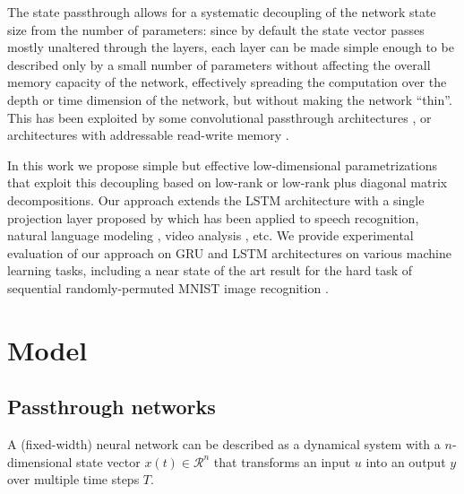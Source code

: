 \documentclass[11pt,a4paper]{article}
\begin{document}
The state passthrough allows for a systematic decoupling of the network state size from the number of parameters: since by default the state vector passes mostly unaltered through the layers, each layer can be made simple enough to be described only by a small number of parameters without affecting the overall memory capacity of the network, effectively spreading the computation over the depth or time dimension of the network, but without making the network ``thin''. This has been exploited by some convolutional passthrough architectures \cite{Srivastava2015, He2015, Kaiser2015}, or architectures with addressable read-write memory \cite{Graves2014, Danihelka2016}.

In this work we propose simple but effective low-dimensional parametrizations that exploit this decoupling based on low-rank or low-rank plus diagonal matrix decompositions. Our approach extends the LSTM architecture with a single projection layer proposed by  which has been applied to speech recognition, natural language modeling \cite{Jozefowicz2016}, video analysis \cite{Sun2015}, etc. We provide experimental evaluation of our approach on GRU and LSTM architectures on various machine learning tasks, including a near state of the art result for the hard task of sequential randomly-permuted MNIST image recognition \cite{Le2015}.

\section{Model}
\label{SEC:MODEL}

\subsection{Passthrough networks}
\label{SEC:MODEL:PN}

A (fixed-width) neural network can be described as a dynamical system with a $n$-dimensional state vector $x(t) \in \mathcal{R}^n$ that transforms an input $u$ into an output $y$ over multiple time steps $T$. 

\end{document}
